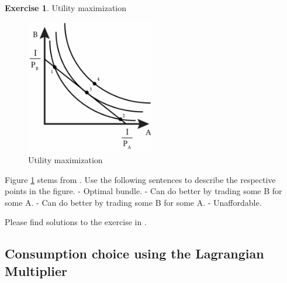\documentclass[
  12pt,
  oneside]{book}
\theoremstyle{definition}
\theoremstyle{definition}
\theoremstyle{definition}
\newtheorem{exercise}{Exercise}[chapter]
\theoremstyle{definition}
\theoremstyle{remark}
\begin{document}
\begin{exercise}
\protect\hypertarget{exr:Umax}{}\label{exr:Umax}Utility maximization

\begin{figure}
\centering
\includegraphics[width=0.5\textwidth,height=\textheight]{fig/utility-max.jpg}
\caption[\label{fig:utilmax} Utility maximization]{\label{fig:utilmax} Utility maximization\footnotemark{}}
\end{figure}

Figure \ref{fig:utilmax} stems from \citet[ch.~4]{Emerson2020Intermediate}. Use the following sentences to describe the respective points in the figure.
- Optimal bundle.
- Can do better by trading some B for some A.
- Can do better by trading some B for some A.
- Unaffordable.

Please find solutions to the exercise in \citet[ch.~4]{Emerson2020Intermediate}.
\end{exercise}

\hypertarget{consumption-choice-using-the-lagrangian-multiplier}{%
\subsection{Consumption choice using the Lagrangian Multiplier}\label{consumption-choice-using-the-lagrangian-multiplier}}
\end{document}
